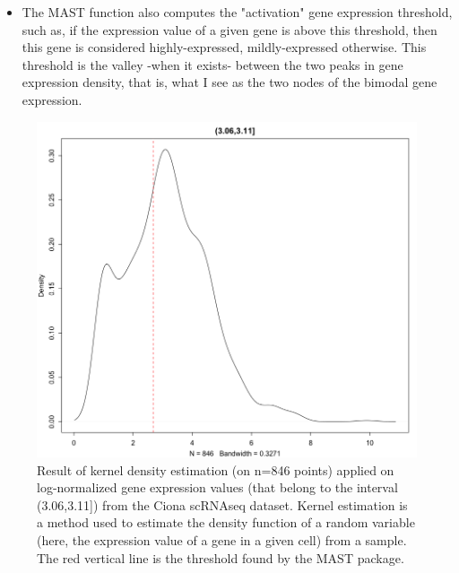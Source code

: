 \documentclass{report}
\begin{document}
{\begin{itemize}
Actually, \cite{finak2015mast} shows the choice of the background noise value does not matter much. I can thus later annotate genes being dropout by marking genes having a null expression value. Dropout events are considered to depend on the mean gene expression value of a feature\cite{kharchenko2014bayesian}. However, the absolute value of a gene in a given cell by itself is not useful, the most important part is to know the gene expression value respect to the expression values of other genes in the same cell.\\

Hence the values on which the regression will be performed are the following weighted mean values: if C is the set of cells, and G the set of genes, the value associated with a given gene $g$ is: $\sum{_{j \in C} \frac{M[g, j]}{\sum{_{k \in G} M[k, j]}}}$.
\item The MAST function also computes the "activation" gene expression threshold, such as, if the expression value of a given gene is above this threshold, then this gene is considered highly-expressed, mildly-expressed otherwise. This threshold is the valley -when it exists- between the two peaks in gene expression density, that is, what I see as the two nodes of the bimodal gene expression.
\end{itemize}

\begin{figure}[H]
\centering
\includegraphics[scale=0.35]{illustrations/densityCionaLogNorm.png}
\caption{Result of kernel density estimation\cite{parzen1962estimation} (on n=846 points) applied on log-normalized gene expression values (that belong to the interval (3.06,3.11]) from the Ciona\cite{suyama2016singlecell} scRNAseq dataset. Kernel estimation is a method used to estimate the density function of a random variable (here, the expression value of a gene in a given cell) from a sample. The red vertical line is the threshold found by the MAST package.}
\label{densityCiona2}
\end{figure}

}
\end{document}
